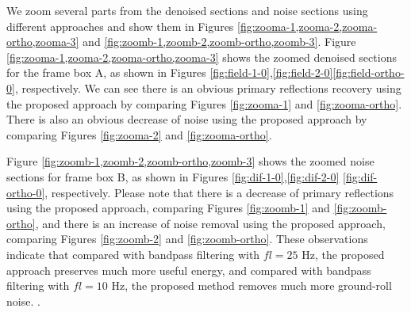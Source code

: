 We zoom several parts from the denoised sections and noise sections using different approaches and show them in Figures \ref{fig:zooma-1,zooma-2,zooma-ortho,zooma-3} and \ref{fig:zoomb-1,zoomb-2,zoomb-ortho,zoomb-3}. Figure \ref{fig:zooma-1,zooma-2,zooma-ortho,zooma-3} shows the zoomed denoised sections for the frame box A, as shown in Figures \ref{fig:field-1-0},\ref{fig:field-2-0}\wen{, }\ref{fig:field-ortho-0},  respectively. We can see there is an obvious primary reflections recovery using the proposed approach by comparing Figures \ref{fig:zooma-1} and \ref{fig:zooma-ortho}. There is also an obvious decrease of noise using the proposed approach by comparing Figures \ref{fig:zooma-2} and \ref{fig:zooma-ortho}. 

Figure \ref{fig:zoomb-1,zoomb-2,zoomb-ortho,zoomb-3} shows the zoomed noise sections for frame box B, as shown in Figures \ref{fig:dif-1-0},\ref{fig:dif-2-0}\wen{, } \ref{fig:dif-ortho-0}, respectively. Please note that there is a decrease of primary reflections using the proposed approach, comparing Figures \ref{fig:zoomb-1} and \ref{fig:zoomb-ortho}, and there is an increase of noise removal using the proposed approach, comparing Figures \ref{fig:zoomb-2} and \ref{fig:zoomb-ortho}.  These observations indicate that compared with bandpass filtering with $fl=25$ Hz, the proposed approach preserves much more useful energy, and compared with bandpass filtering with $fl=10$ Hz, the proposed method removes much more ground-roll noise. .

